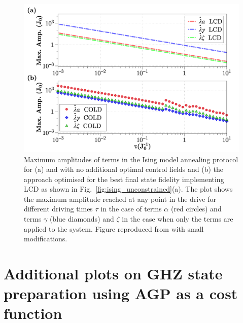 \begin{figure}[t!]
    \centering
    \includegraphics[width=\linewidth]{images/MaxAmp.png} \caption[Plots of maximum amplitudes of LCD drives for the Ising spin chain.]{Maximum amplitudes of  terms in the Ising model annealing protocol for (a)  and   with no additional optimal control fields and (b) the  approach optimised for the best final state fidelity implementing  LCD as shown in Fig.~\ref{fig:ising_unconstrained}(a). The plot shows the maximum amplitude reached at any point in the drive for different driving times $\tau$ in the case of  terms $\alpha$ (red circles) and  terms $\gamma$ (blue diamonds) and $\zeta$ in the case when only the  terms are applied to the system. Figure reproduced from \cite{cepaite_cold_2023} with small modifications.}\label{fig:ising_maxamp}
\end{figure}

\chapter{Additional plots on GHZ state preparation using AGP as a cost function}\label{app:higher_order_AGP}

